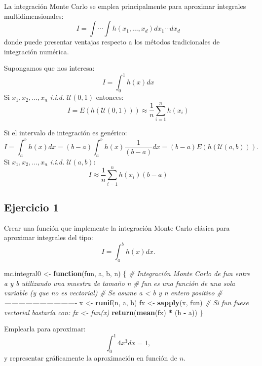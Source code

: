 \documentclass[
]{book}
\newenvironment{Shaded}{\begin{snugshade}}{\end{snugshade}}
\newcommand{\CommentTok}[1]{\textcolor[rgb]{0.56,0.35,0.01}{\textit{#1}}}
\newcommand{\ControlFlowTok}[1]{\textcolor[rgb]{0.13,0.29,0.53}{\textbf{#1}}}
\newcommand{\KeywordTok}[1]{\textcolor[rgb]{0.13,0.29,0.53}{\textbf{#1}}}
\newcommand{\NormalTok}[1]{#1}
\newcommand{\OperatorTok}[1]{\textcolor[rgb]{0.81,0.36,0.00}{\textbf{#1}}}
\newcommand{\StringTok}[1]{\textcolor[rgb]{0.31,0.60,0.02}{#1}}
\theoremstyle{break}
\theoremstyle{definition}
\theoremstyle{definition}
\theoremstyle{definition}
\theoremstyle{remark}
\begin{document}
La integración Monte Carlo se emplea principalmente para aproximar
integrales multidimensionales:
\[I = \int \cdots \int h\left( x_{1},\ldots ,x_{d}\right) 
dx_{1}\cdots dx_{d}\]
donde puede presentar ventajas respecto a los métodos tradicionales de
integración numérica.

Supongamos que nos interesa:
\[I = \int_{0}^{1}h\left( x\right) dx\]
Si \(x_{1},x_{2},\ldots ,x_{n}\) \emph{i.i.d.} \(\mathcal{U}\left( 0,1\right)\)
entonces:
\[I = E\left( h\left( \mathcal{U}\left( 0,1\right) \right) \right)
\approx \frac{1}{n}\sum\limits_{i=1}^{n}h\left( x_{i}\right)\]

Si el intervalo de integración es
genérico:
\[I = \int_{a}^{b}h\left( x\right) dx = 
(b-a)\int_{a}^{b}h\left( x\right) \frac{1}{(b-a)}dx = 
(b-a)E\left( h\left( \mathcal{U}\left( a, b \right) \right) \right).\]
Si \(x_{1},x_{2},\ldots ,x_{n}\) \emph{i.i.d.}
\(\mathcal{U}\left( a, b\right)\):
\[I\approx \frac{1}{n}\sum\limits_{i=1}^{n}h\left( x_{i}\right) (b-a)\]

\hypertarget{ejercicio-1}{%
\subsection{Ejercicio 1}\label{ejercicio-1}}

Crear una función que implemente la integración Monte Carlo clásica
para aproximar integrales del tipo:
\[I=\int_{a}^{b}h\left(  x\right)  dx.\]

\begin{Shaded}
\begin{Highlighting}[]
\NormalTok{mc.integral0 <-}\StringTok{ }\ControlFlowTok{function}\NormalTok{(fun, a, b, n) \{}
  \CommentTok{# Integración Monte Carlo de fun entre a y b utilizando una muestra de tamaño n}
  \CommentTok{# fun es una función de una sola variable (y que no es vectorial)}
  \CommentTok{# Se asume a < b y n entero positivo}
  \CommentTok{# -------------------------------}
\NormalTok{  x <-}\StringTok{ }\KeywordTok{runif}\NormalTok{(n, a, b)}
\NormalTok{  fx <-}\StringTok{ }\KeywordTok{sapply}\NormalTok{(x, fun) }\CommentTok{# Si fun fuese vectorial bastaría con: fx <- fun(x)}
  \KeywordTok{return}\NormalTok{(}\KeywordTok{mean}\NormalTok{(fx) }\OperatorTok{*}\StringTok{ }\NormalTok{(b }\OperatorTok{-}\StringTok{ }\NormalTok{a))}
\NormalTok{\}}
\end{Highlighting}
\end{Shaded}

Emplearla para aproximar:
\[\int_{0}^{1}4x^{3}dx=1,\]
y representar gráficamente la aproximación en función de \(n\).
\end{document}

